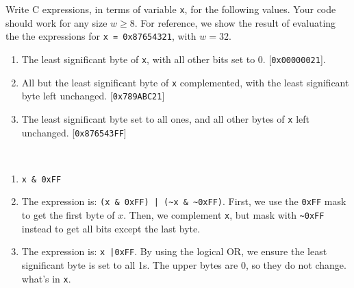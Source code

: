 \documentclass[12pt]{article}
\newenvironment{ex}[2][Exercise]{\begin{trivlist}
		\item[\hskip \labelsep {\bfseries #1}\hskip \labelsep {\bfseries #2.}]}{\end{trivlist}}
\newenvironment{sol}[1][Solution]{\begin{trivlist}
		\item[\hskip \labelsep {\bfseries #1:}]}{\end{trivlist}}
\begin{document}
\begin{ex}{2.12}
	Write C expressions, in terms of variable \texttt{x}, for the following values.
	Your code should work for any size $w\geq 8$. For reference, we show the result
	of evaluating the the expressions for \texttt{x = 0x87654321}, with $w=32$.
	\begin{enumerate}[label=(\alph*)]
		\item The least significant byte of \texttt{x}, with all other bits set
		to $0$. [\texttt{0x00000021}].
		\item All but the least significant byte of \texttt{x} complemented, with
		the least significant byte left unchanged. [\texttt{0x789ABC21}]
		\item The least significant byte set to all ones, and all other bytes
		of \texttt{x} left unchanged. [\texttt{0x876543FF}]
	\end{enumerate}
\end{ex}

\begin{sol}
	\
	\begin{enumerate}[label=(\alph*)]
		\item \texttt{x \& 0xFF}
		\item  The expression is: \texttt{(x \& 0xFF) | (\~{}x \& \~{}0xFF)}. First,
		we use the \texttt{0xFF} mask to get the first byte of $x$. Then, we complement
		\texttt{x}, but mask with \texttt{\~{}0xFF} instead to get all bits except
		the last byte.
		\item The expression is: \texttt{x |{}0xFF}. By using the logical OR, we
		ensure the least significant byte is set to all 1s. The upper bytes are
		0, so they do not change. what's in \texttt{x}.
	\end{enumerate}
\end{sol}
\end{document}
